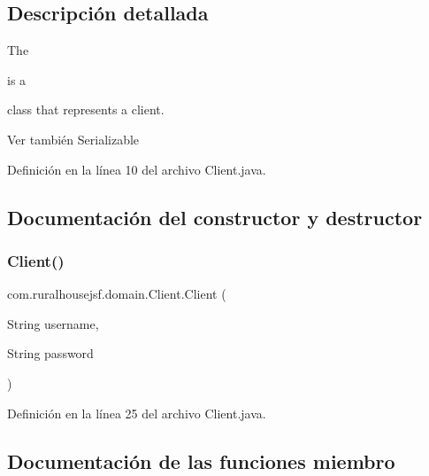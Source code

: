 \subsection{Descripción detallada}
The
\begin{DoxyCode}{0}
\end{DoxyCode}
 is a
\begin{DoxyCode}{0}
\end{DoxyCode}
 class that represents a client.

\begin{DoxySeeAlso}{Ver también}
Serializable 
\end{DoxySeeAlso}


Definición en la línea 10 del archivo Client.\+java.



\subsection{Documentación del constructor y destructor}
\mbox{\label{classcom_1_1ruralhousejsf_1_1domain_1_1_client_a57bf8892cfbb684bcda11d6bb786871b}} 
\subsubsection{\texorpdfstring{Client()}{Client()}}
{\footnotesize\ttfamily com.\+ruralhousejsf.\+domain.\+Client.\+Client (\begin{DoxyParamCaption}\item[{String}]{username,  }\item[{String}]{password }\end{DoxyParamCaption})}



Definición en la línea 25 del archivo Client.\+java.



\subsection{Documentación de las funciones miembro}
\mbox{\label{classcom_1_1ruralhousejsf_1_1domain_1_1_client_acf199d84c39f08cea14078ef175be9f5}} 
